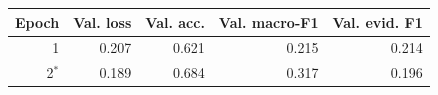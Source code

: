 \begin{tabular}{rrrrr}\toprule
Epoch & Val. loss & Val. acc. & Val. macro-F1 & Val. evid. F1 \\\midrule
1 & 0.207 & 0.621 & 0.215 & 0.214 \\
2$^*$ & 0.189 & 0.684 & 0.317 & 0.196 \\
\bottomrule\end{tabular}
